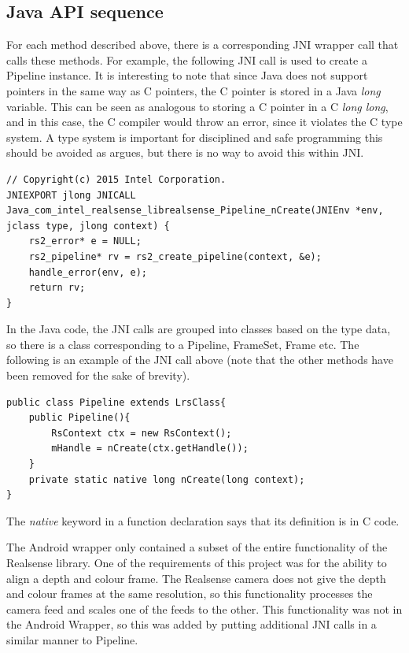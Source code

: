     \subsection{Java API sequence}
    For each method described above, there is a corresponding JNI wrapper call that calls these methods. For example, the following JNI call is used to create a Pipeline instance. It is interesting to note that since Java does not support pointers in the same way as C pointers, the C pointer is stored in a Java {\slshape long} variable. This can be seen as analogous to storing a C pointer in a C {\slshape long long}, and in this case, the C compiler would throw an error, since it violates the C type system. A type system is important for disciplined and safe programming this should be avoided as \cite{pierce2002types} argues, but there is no way to avoid this within JNI.
    \begin{lstlisting}[style=CStyle]
// Copyright(c) 2015 Intel Corporation.
JNIEXPORT jlong JNICALL Java_com_intel_realsense_librealsense_Pipeline_nCreate(JNIEnv *env, jclass type, jlong context) {
    rs2_error* e = NULL;
    rs2_pipeline* rv = rs2_create_pipeline(context, &e);
    handle_error(env, e);
    return rv;
}\end{lstlisting}

    In the Java code, the JNI calls are grouped into classes based on the type data, so there is a class corresponding to a Pipeline, FrameSet, Frame etc. The following is an example of the JNI call above (note that the other methods have been removed for the sake of brevity).

    \begin{lstlisting}[style=CSharpStyle]
public class Pipeline extends LrsClass{
    public Pipeline(){
        RsContext ctx = new RsContext();
        mHandle = nCreate(ctx.getHandle());
    }
    private static native long nCreate(long context);
}\end{lstlisting}

    The {\slshape native} keyword in a function declaration says that its definition is in C code.

    The Android wrapper only contained a subset of the entire functionality of the Realsense library. One of the requirements of this project was for the ability to align a depth and colour frame. The Realsense camera does not give the depth and colour frames at the same resolution, so this functionality processes the camera feed and scales one of the feeds to the other. This functionality was not in the Android Wrapper, so this was added by putting additional JNI calls in a similar manner to Pipeline.

